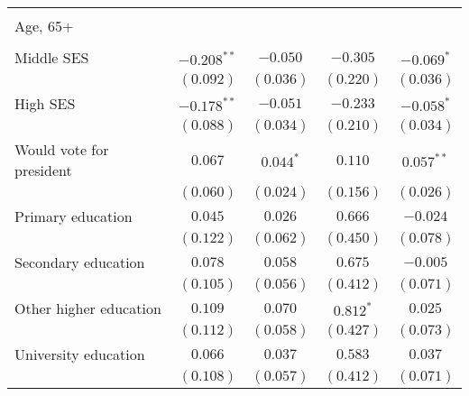 \begin{table}
\begin{center}
\begin{tabular}{l c c c c}
                                                    &               &               &               &                \\
Age, 65+                                            &               &               &               &                \\
                                                    &               &               &               &                \\
Middle SES                                          & $-0.208^{**}$ & $-0.050$      & $-0.305$      & $-0.069^{*}$   \\
                                                    & $(0.092)$     & $(0.036)$     & $(0.220)$     & $(0.036)$      \\
High SES                                            & $-0.178^{**}$ & $-0.051$      & $-0.233$      & $-0.058^{*}$   \\
                                                    & $(0.088)$     & $(0.034)$     & $(0.210)$     & $(0.034)$      \\
Would vote for president                            & $0.067$       & $0.044^{*}$   & $0.110$       & $0.057^{**}$   \\
                                                    & $(0.060)$     & $(0.024)$     & $(0.156)$     & $(0.026)$      \\
Primary education                                   & $0.045$       & $0.026$       & $0.666$       & $-0.024$       \\
                                                    & $(0.122)$     & $(0.062)$     & $(0.450)$     & $(0.078)$      \\
Secondary education                                 & $0.078$       & $0.058$       & $0.675$       & $-0.005$       \\
                                                    & $(0.105)$     & $(0.056)$     & $(0.412)$     & $(0.071)$      \\
Other higher education                              & $0.109$       & $0.070$       & $0.812^{*}$   & $0.025$        \\
                                                    & $(0.112)$     & $(0.058)$     & $(0.427)$     & $(0.073)$      \\
University education                                & $0.066$       & $0.037$       & $0.583$       & $0.037$        \\
                                                    & $(0.108)$     & $(0.057)$     & $(0.412)$     & $(0.071)$      \\

\end{tabular}
\end{center}
\end{table}
